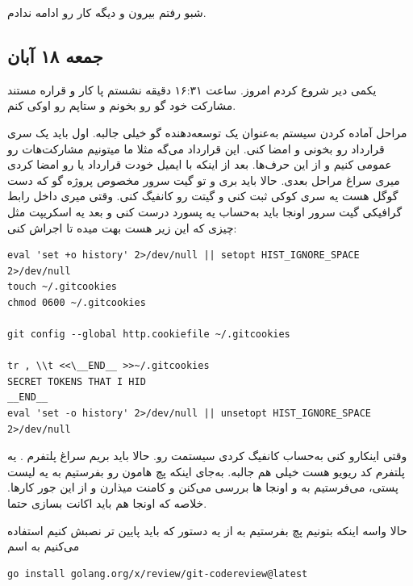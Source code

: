 شبو رفتم بیرون و دیگه کار رو ادامه ندادم.

\subsection{جمعه ۱۸ آبان}

یکمی دیر شروع کردم امروز. ساعت ۱۶:۳۱ دقیقه نشستم پا کار و قراره مستند مشارکت خود گو رو بخونم و ستاپم رو اوکی کنم.

مراحل آماده کردن سیستم به‌عنوان یک توسعه‌دهنده گو خیلی جالبه. اول باید یک سری قرارداد رو بخونی و امضا کنی.
این قرارداد می‌گه مثلا ما میتونیم مشارکت‌هات رو عمومی کنیم و از این حرف‌ها. بعد از اینکه با ایمیل خودت قرارداد یا 
رو امضا کردی میری سراغ مراحل بعدی. حالا باید بری و تو گیت سرور مخصوص پروژه گو که دست گوگل هست یه سری کوکی ثبت کنی و
گیتت رو کانفیگ کنی. وقتی میری داخل رابط گرافیکی گیت سرور
اونجا باید به‌حساب یه پسورد درست کنی و بعد یه اسکریپت مثل چیزی که این زیر هست بهت میده تا اجراش کنی:

\begin{latin}
\begin{verbatim}
eval 'set +o history' 2>/dev/null || setopt HIST_IGNORE_SPACE 2>/dev/null
touch ~/.gitcookies
chmod 0600 ~/.gitcookies

git config --global http.cookiefile ~/.gitcookies

tr , \\t <<\__END__ >>~/.gitcookies
SECRET TOKENS THAT I HID
__END__
eval 'set -o history' 2>/dev/null || unsetopt HIST_IGNORE_SPACE 2>/dev/null
\end{verbatim}
\end{latin}

وقتی اینکارو کنی به‌حساب کانفیگ کردی سیستمت رو. حالا باید بریم سراغ پلتفرم . یه پلتفرم کد ریویو هست خیلی هم جالبه.
به‌جای اینکه پچ هامون رو بفرستیم به یه لیست پستی، می‌فرستیم به  و اونجا  ها بررسی می‌کنن و کامنت میذارن و
از این جور کارها. خلاصه که اونجا هم باید اکانت بسازی حتما.

حالا واسه اینکه بتونیم پچ بفرستیم به  از یه دستور که باید پایین تر نصبش کنیم استفاده می‌کنیم به اسم 

\begin{latin}
\begin{verbatim}
go install golang.org/x/review/git-codereview@latest
\end{verbatim}
\end{latin}

